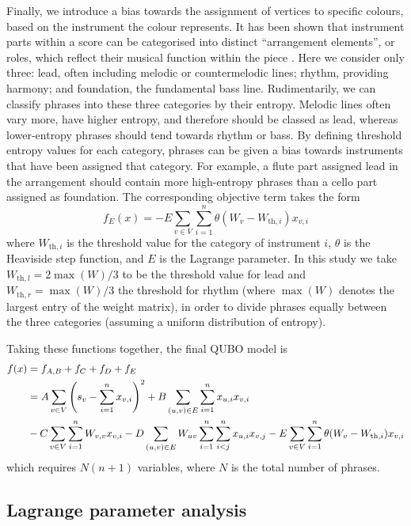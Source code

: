 \documentclass[12pt]{article}
\theoremstyle{definition}
\begin{document}
Finally, we introduce a bias towards the assignment of vertices to specific colours, based on the instrument the colour represents. It has been shown that instrument parts within a score can be categorised into distinct ``arrangement elements'', or roles, which reflect their musical function within the piece \cite{owsinski_mixing_2017}. Here we consider only three: lead, often including melodic or countermelodic lines; rhythm, providing harmony; and foundation, the fundamental bass line. Rudimentarily, we can classify phrases into these three categories by their entropy. Melodic lines often vary more, have higher entropy, and therefore should be classed as lead, whereas lower-entropy phrases should tend towards rhythm or bass. By defining threshold entropy values for each category, phrases can be given a bias towards instruments that have been assigned that category. For example, a flute part assigned lead in the arrangement should contain more high-entropy phrases than a cello part assigned as foundation. The corresponding objective term takes the form
\begin{equation}
    f_E(x) = -E\sum_{v\in V}\sum_{i=1}^n \theta(W_v - W_{\text{th},i})x_{v,i}
\end{equation}
where $W_{\text{th},i}$ is the threshold value for the category of instrument $i$, $\theta$ is the Heaviside step function, and $E$ is the Lagrange parameter. In this study we take $W_{\text{th},l}=2\max(W)/3$ to be the threshold value for lead and $W_{\text{th},r}=\max(W)/3$ the threshold for rhythm (where $\max(W)$ denotes the largest entry of the weight matrix), in order to divide phrases equally between the three categories (assuming a uniform distribution of entropy).

Taking these functions together, the final QUBO model is
\begin{align}
    f(x)&=f_{A,B}+f_C+f_D+f_E \notag\\
    &=A\sum_{v \in V}\left(s_v-\sum_{i=1}^{n} x_{v,i}\right)^2+B\sum_{(u,v) \in E}\sum_{i=1}^n x_{u,i}x_{v,i} \notag\\
    &-C\sum_{v \in V}\sum_{i=1}^n W_{v,v}x_{v,i}-D\sum_{(u,v)\in E}W_{uv}\sum_{i=1}^n\sum_{i<j}^n x_{u,i}x_{v,j}-E\sum_{v \in V}\sum_{i=1}^n\theta(W_v-W_{\text{th},i})x_{v,i}
    \label{eq:problem-qubo}
\end{align}
which requires $N(n+1)$ variables, where $N$ is the total number of phrases.

\subsection{Lagrange parameter analysis}
\end{document}
